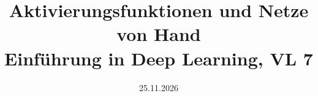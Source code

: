 


\graphicspath{{../images/}}

\title[Netze von Hand (VL 7)]{Aktivierungsfunktionen und Netze von Hand\\\large Einführung in Deep Learning, VL 7}
\date{25.11.2026}



\begin{frame}
  \titlepage


\end{frame}
